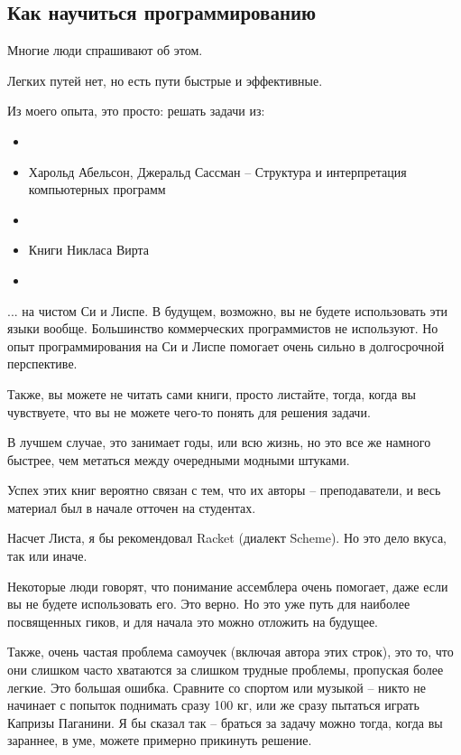 



\subsection*{Как научиться программированию}

Многие люди спрашивают об этом.

Легких путей нет, но есть пути быстрые и эффективные.

Из моего опыта, это просто: решать задачи из:

\begin{itemize}
\item \KRBook
\item Харольд Абельсон, Джеральд Сассман -- Структура и интерпретация компьютерных программ
\item \TAOCP
\item Книги Никласа Вирта
\item \RobPikePractice
\end{itemize}

... на чистом Си и Лиспе.
В будущем, возможно, вы не будете использовать эти языки вообще.
Большинство коммерческих программистов не используют. Но опыт программирования на Си и Лиспе помогает очень сильно в 
долгосрочной перспективе.

Также, вы можете не читать сами книги, просто листайте, тогда, когда вы чувствуете, что вы не можете чего-то
понять для решения задачи.

В лучшем случае, это занимает годы, или всю жизнь, но это все же намного быстрее, чем метаться между очередными модными
штуками.

Успех этих книг вероятно связан с тем, что их авторы -- преподаватели, и весь материал был в начале отточен на студентах.

Насчет Листа, я бы рекомендовал Racket (диалект Scheme). Но это дело вкуса, так или иначе.

Некоторые люди говорят, что понимание ассемблера очень помогает, даже если вы не будете использовать его.
Это верно.
Но это уже путь для наиболее посвященных гиков, и для начала это можно отложить на будущее.

Также, очень частая проблема самоучек (включая автора этих строк), это то, что они слишком часто хватаются
за слишком трудные проблемы, пропуская более легкие.
Это большая ошибка.
Сравните со спортом или музыкой -- никто не начинает с попыток поднимать сразу 100 кг,
или же сразу пытаться играть Капризы Паганини.
Я бы сказал так -- браться за задачу можно тогда, когда вы зараннее, в уме, можете примерно прикинуть решение.


